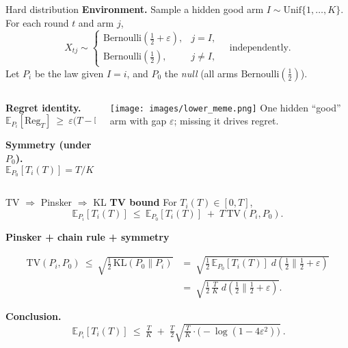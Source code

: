 \documentclass{beamer}
\newcommand{\E}{\mathbb{E}}
\newcommand{\Reg}{\mathrm{Reg}}
\newcommand{\KL}{\mathrm{KL}}
\newcommand{\Ber}{\mathrm{Bernoulli}}
\newcommand{\TV}{\mathrm{TV}}
\begin{document}
\begin{frame}{Hard distribution}
  \small
  \textbf{Environment.} Sample a hidden good arm $I\sim\mathrm{Unif}\{1,\dots,K\}$. For each round $t$ and arm $j$,
  \[
    X_{tj}\sim
    \begin{cases}
      \Ber(\tfrac12+\varepsilon), & j=I,     \\
      \Ber(\tfrac12),             & j\neq I,
    \end{cases}
    \quad\text{independently.}
  \]
  Let $P_i$ be the law given $I=i$, and $P_0$ the \emph{null} (all arms $\Ber(\tfrac12)$).
  \begin{columns}[T,onlytextwidth]
    \begin{column}{0.58\textwidth}
      \medskip
      \textbf{Regret identity.}
      \[
        \E_{P_i}[\Reg_T]\ \ge\ \varepsilon\big(T-\E_{P_i}[T_i(T)]\big).
      \]

      \medskip
      \textbf{Symmetry (under $P_0$).}
      \[
        \E_{P_0}[T_i(T)]=T/K\quad\text{for all }i.
      \]
    \end{column}
    \begin{column}{0.42\textwidth}
      \centering
      \texttt{[image: images/lower\_meme.png]}
      \scriptsize
      One hidden “good” arm with gap $\varepsilon$; missing it drives regret.
    \end{column}
  \end{columns}
\end{frame}


\begin{frame}{TV $\Rightarrow$ Pinsker $\Rightarrow$ KL}
  \textbf{TV bound} For $T_i(T)\in[0,T]$,
  \[
    \E_{P_i}[T_i(T)]\ \le\ \E_{P_0}[T_i(T)]\;+\;T\,\TV(P_i,P_0).
  \]

  \textbf{Pinsker + chain rule + symmetry}

  \begin{align*}
    \TV(P_i,P_0)\ \le\ \sqrt{\tfrac12\,\KL(P_0\|P_i)}
     & =\ \sqrt{\tfrac12\,\E_{P_0}[T_i(T)]\;d(\tfrac12\|\tfrac12+\varepsilon)} \\
     & =\ \sqrt{\tfrac12\,\tfrac{T}{K}\;d(\tfrac12\|\tfrac12+\varepsilon)}.
  \end{align*}

  \textbf{Conclusion.}
  \[
    \boxed{\ \E_{P_i}[T_i(T)]\ \le\ \tfrac{T}{K}\;+\;\tfrac{T}{2}\sqrt{\tfrac{T}{K}\cdot\big(-\log(1-4\varepsilon^2)\big)}\ }.
  \]
\end{frame}
\end{document}
